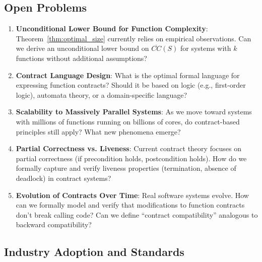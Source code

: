\documentclass[a4paper,12pt]{article}
\theoremstyle{definition}
\begin{document}
\subsection{Open Problems}

\begin{enumerate}
	\item \textbf{Unconditional Lower Bound for Function Complexity}: Theorem~\ref{thm:optimal_size} currently relies on empirical observations. Can we derive an unconditional lower bound on $\overline{CC}(S)$ for systems with $k$ functions without additional assumptions?
	
	\item \textbf{Contract Language Design}: What is the optimal formal language for expressing function contracts? Should it be based on logic (e.g., first-order logic), automata theory, or a domain-specific language?
	
	\item \textbf{Scalability to Massively Parallel Systems}: As we move toward systems with millions of functions running on billions of cores, do contract-based principles still apply? What new phenomena emerge?
	
	\item \textbf{Partial Correctness vs. Liveness}: Current contract theory focuses on partial correctness (if precondition holds, postcondition holds). How do we formally capture and verify liveness properties (termination, absence of deadlock) in contract systems?
	
	\item \textbf{Evolution of Contracts Over Time}: Real software systems evolve. How can we formally model and verify that modifications to function contracts don't break calling code? Can we define ``contract compatibility'' analogous to backward compatibility?
\end{enumerate}

\subsection{Industry Adoption and Standards}
\end{document}
